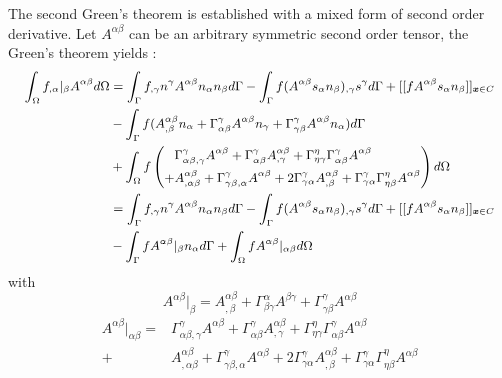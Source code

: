 The second Green's theorem is established with a mixed form of second order derivative. Let $A^{\alpha\beta}$ can be an arbitrary symmetric second order tensor, the Green's theorem yields \cite{benzaken2021}:
\begin{equation}\small
\begin{split}
\int_\Omega f_{,\alpha}\vert_\beta A^{\alpha\beta} d\Omega &= 
\int_\Gamma f_{,\gamma} n^\gamma A^{\alpha\beta} n_\alpha n_\beta d\Gamma 
- \int_\Gamma f(A^{\alpha\beta}s_\alpha n_\beta)_{,\gamma} s^\gamma d\Gamma
+ [[f A^{\alpha\beta} s_\alpha n_\beta]]_{\boldsymbol x \in C} \\
&- \int_\Gamma f(A^{\alpha\beta}_{,\beta}n_\alpha + \Gamma^\gamma_{\alpha\beta}A^{\alpha\beta}n_\gamma + \Gamma^\gamma_{\gamma\beta} A^{\alpha\beta} n_\alpha) d\Gamma \\
&+ \int_\Omega f \left (
\begin{split}
&\Gamma^\gamma_{\alpha\beta,\gamma}A^{\alpha\beta} + \Gamma^\gamma_{\alpha\beta} A^{\alpha\beta}_{,\gamma} + \Gamma^\eta_{\eta\gamma}\Gamma^\gamma_{\alpha\beta} A^{\alpha\beta} \\
+ &A^{\alpha\beta}_{,\alpha\beta} + \Gamma^\gamma_{\gamma\beta,\alpha}A^{\alpha\beta}+2\Gamma^\gamma_{\gamma\alpha}A^{\alpha\beta}_{,\beta} + \Gamma^{\gamma}_{\gamma\alpha}\Gamma^\eta_{\eta\beta} A^{\alpha\beta}
\end{split}
\right ) d\Omega \\
&=\int_\Gamma f_{,\gamma} n^\gamma A^{\alpha\beta} n_\alpha n_\beta d\Gamma 
- \int_\Gamma f(A^{\alpha\beta}s_\alpha n_\beta)_{,\gamma} s^\gamma d\Gamma
+ [[f A^{\alpha\beta} s_\alpha n_\beta]]_{\boldsymbol x \in C} \\
&-\int_\Gamma f A^{\alpha\beta}\vert_\beta n_\alpha d\Gamma
+ \int_\Omega f A^{\alpha\beta}\vert_{\alpha\beta} d\Omega
\end{split}
\end{equation}
with
\begin{equation}
A^{\alpha\beta}\vert_\beta = A^{\alpha\beta}_{,\beta} + \Gamma^\alpha_{\beta\gamma}A^{\beta\gamma} + \Gamma^\gamma_{\gamma\beta} A^{\alpha\beta}
\end{equation}
\begin{equation}
\begin{split}
A^{\alpha\beta}\vert_{\alpha\beta} = &\Gamma^\gamma_{\alpha\beta,\gamma}A^{\alpha\beta} + \Gamma^\gamma_{\alpha\beta} A^{\alpha\beta}_{,\gamma} + \Gamma^\eta_{\eta\gamma}\Gamma^\gamma_{\alpha\beta} A^{\alpha\beta} \\
+ &A^{\alpha\beta}_{,\alpha\beta} + \Gamma^\gamma_{\gamma\beta,\alpha}A^{\alpha\beta}+2\Gamma^\gamma_{\gamma\alpha}A^{\alpha\beta}_{,\beta} + \Gamma^{\gamma}_{\gamma\alpha}\Gamma^\eta_{\eta\beta} A^{\alpha\beta}
\end{split}
\end{equation}

